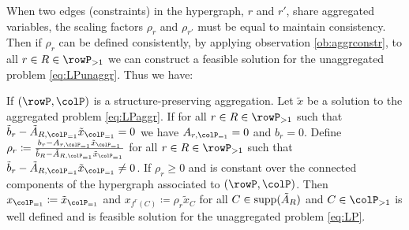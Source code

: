 When two edges (constraints) in the hypergraph, \(r\) and \(r'\), share aggregated variables, the scaling factors \(\rho_r\) and \(\rho_{r'}\) must be equal to maintain consistency. 
Then if \(\rho_r\) can be defined consistently, by applying observation \ref{ob:aggrconstr}, to all \(r \in R \in \rowP_{>1}\) we can construct a feasible solution for the unaggregated problem \eqref{eq:LPunaggr}. Thus we have: 
\begin{proposition}
\label{prop:xaggfeasible}
If \((\rowP, \colP)\) is a structure-preserving aggregation. Let \(\tilde{x}\) be a solution 
to the aggregated problem \eqref{eq:LPaggr}. If for all \(r \in R \in \rowP_{>1}\) such that  \(\tilde{b}_r - \tilde{A}_{R, \colP_{=1}} \tilde{x}_{\colP_{=1}} = 0\) we have \(A_{r,\colP_{=1}} = 0\) and \(b_r=0\).
Define \(\rho_r \coloneqq \frac{b_r - A_{r, \colP_{=1}} \tilde{x}_{\colP_{=1}}}{\tilde{b}_R - \tilde{A}_{R, \colP_{=1}} \tilde{x}_{\colP_{=1}}}\) for all \(r \in R \in \rowP_{>1}\) such that   \(\tilde{b}_r - \tilde{A}_{R, \colP_{=1}} \tilde{x}_{\colP_{=1}} \neq 0\). If \(\rho_r \geq 0\) and is constant over the connected components of the hypergraph associated to \((\rowP, \colP)\). 
Then \(x_{\colP_{=1}} \coloneqq \tilde{x}_{\colP_{=1}}\) and \(x_{f^r(C)} \coloneqq \rho_r \tilde{x}_C\) for all \(C \in \operatorname{supp}(\tilde{A}_R)\) and \(C \in \colP_{>1}\) is well defined and is feasible solution for the unaggregated problem \eqref{eq:LP}.
\end{proposition}




